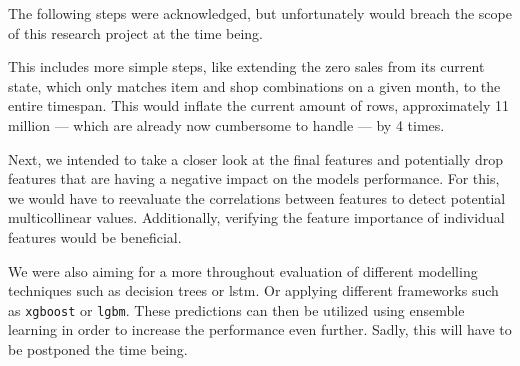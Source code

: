 The following steps were acknowledged, but unfortunately would breach the scope of this research project at the time being.

This includes more simple steps, like extending the zero sales from its current state, which only matches item and shop combinations on a given month, to the entire timespan.
This would inflate the current amount of rows, approximately 11 million --- which are already now cumbersome to handle --- by 4 times.

Next, we intended to take a closer look at the final features and potentially drop features that are having a negative impact on the models performance. For this, we would have to reevaluate the correlations between features to detect potential multicollinear values. Additionally, verifying the feature importance of individual features would be beneficial.

We were also aiming for a more throughout evaluation of different modelling techniques such as decision trees or \acrshort{lstm}. Or applying different frameworks such as \texttt{xgboost} or \texttt{\acrshort{lgbm}}.
These predictions can then be utilized using ensemble learning in order to increase the performance even further. Sadly, this will have to be postponed the time being.
